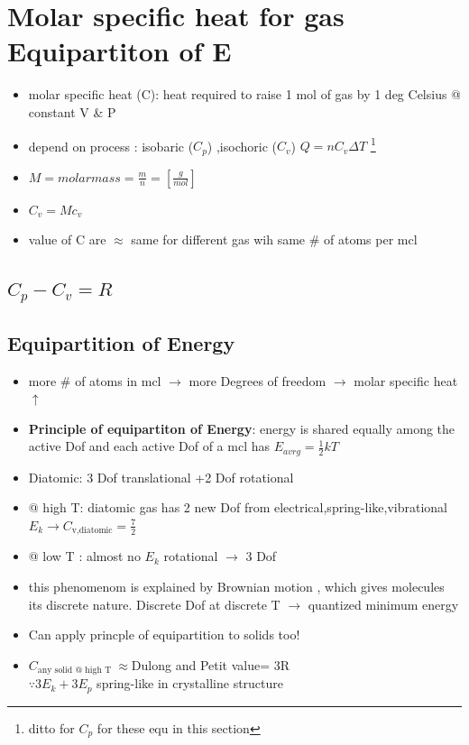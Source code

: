 \documentclass[12 pt , twoside, letterpaper] {article}
\begin{document}
	\section{Molar specific heat for gas Equipartiton of E}
		\begin{itemize}
			\item molar specific heat (C): heat required to raise 1 mol of gas by 1 deg Celsius @ constant V \& P
			\item depend on process : isobaric ($C_p$) ,isochoric ($C_v$)
				$Q=nC_v\Delta T$ \footnote{ditto for $C_p$ for these equ in this section}
			\item$ M= molar mass= \frac{m}{n}=[\frac{g}{mol}]$			
			\item $C_v= Mc_v$
			\item value of C are $\approx$ same for different gas wih same \# of atoms per mcl
		\end{itemize}
		\subsection{$C_p -C_v=R$}
			\vspace{15cm}
		\subsection{Equipartition of Energy}
		\begin{itemize}
			\item more \# of atoms in mcl $\rightarrow$ more Degrees of freedom $\rightarrow$  molar specific heat $\uparrow$
			\item \textbf{Principle of equipartiton of Energy}: 
					energy is shared equally among the active Dof and each active Dof of a mcl has $E_{avrg}= \frac{1}{2}kT$
			\item Diatomic: 3 Dof translational +2 Dof rotational
			\item @ high T: diatomic gas has 2 new Dof from electrical,spring-like,vibrational $E_k \rightarrow C_{\text{v,diatomic}}=\frac{7}{2}$
			\item @ low T : almost no $E_k$ rotational $\rightarrow$ 3 Dof
			\item this phenomenom is explained by Brownian motion , which gives molecules its discrete nature. Discrete Dof at discrete T $\rightarrow$ quantized minimum energy
			\item Can apply princple of equipartition to solids too!
			\item $C_{\text{any solid @ high T }}\approx $Dulong and Petit value= 3R
			\\ $\because 3 E_k + 3E_p$ spring-like in crystalline structure
		\end{itemize}
\end{document}
